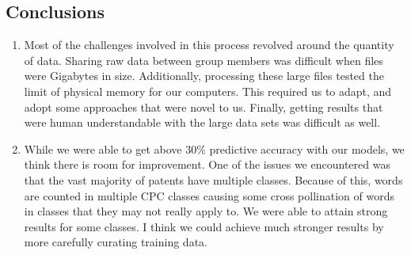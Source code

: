 \documentclass{article}
\begin{document}
\subsection{Conclusions}
\begin{enumerate}
  \item Most of the challenges involved in this process revolved around the quantity of data. Sharing raw data between group members was difficult when files were Gigabytes in size. Additionally, processing these large files tested the limit of physical memory for our computers. This required us to adapt, and adopt some approaches that were novel to us. Finally, getting results that were human understandable with the large data sets was difficult as well. 

  \item While we were able to get above 30\% predictive accuracy with our models, we think there is room for improvement. One of the issues we encountered was that the vast majority of patents have multiple classes. Because of this, words are counted in multiple CPC classes causing some cross pollination of words in classes that they may not really apply to. We were able to attain strong results for some classes. I think we could achieve much stronger results by more carefully curating training data. 
\end{enumerate}


 
 




\end{document}
